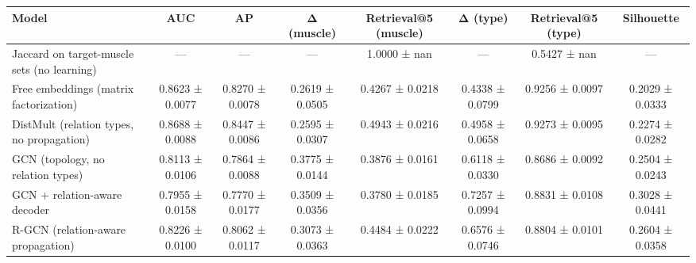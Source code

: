 \begin{tabular}{lccccccc}
\toprule
Model & AUC & AP & Δ (muscle) & Retrieval@5 (muscle) & Δ (type) & Retrieval@5 (type) & Silhouette \\
\midrule
Jaccard on target-muscle sets (no learning) & — & — & — & 1.0000 ± nan & — & 0.5427 ± nan & — \\
Free embeddings (matrix factorization) & 0.8623 ± 0.0077 & 0.8270 ± 0.0078 & 0.2619 ± 0.0505 & 0.4267 ± 0.0218 & 0.4338 ± 0.0799 & 0.9256 ± 0.0097 & 0.2029 ± 0.0333 \\
DistMult (relation types, no propagation) & 0.8688 ± 0.0088 & 0.8447 ± 0.0086 & 0.2595 ± 0.0307 & 0.4943 ± 0.0216 & 0.4958 ± 0.0658 & 0.9273 ± 0.0095 & 0.2274 ± 0.0282 \\
GCN (topology, no relation types) & 0.8113 ± 0.0106 & 0.7864 ± 0.0088 & 0.3775 ± 0.0144 & 0.3876 ± 0.0161 & 0.6118 ± 0.0330 & 0.8686 ± 0.0092 & 0.2504 ± 0.0243 \\
GCN + relation-aware decoder & 0.7955 ± 0.0158 & 0.7770 ± 0.0177 & 0.3509 ± 0.0356 & 0.3780 ± 0.0185 & 0.7257 ± 0.0994 & 0.8831 ± 0.0108 & 0.3028 ± 0.0441 \\
R-GCN (relation-aware propagation) & 0.8226 ± 0.0100 & 0.8062 ± 0.0117 & 0.3073 ± 0.0363 & 0.4484 ± 0.0222 & 0.6576 ± 0.0746 & 0.8804 ± 0.0101 & 0.2604 ± 0.0358 \\
\bottomrule
\end{tabular}
